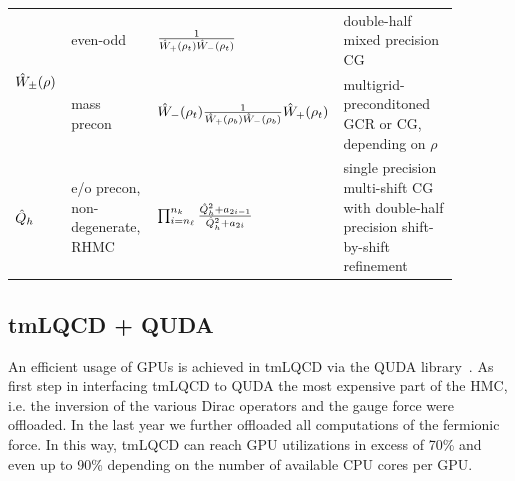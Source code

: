 \documentclass[a0,portrait]{a0poster}
\begin{document}
\begin{multicols}{2}
    \begin{tabular}{p{0.08\linewidth}p{0.2\linewidth}p{0.3\linewidth}p{0.3\linewidth}}
    \multirow{2}{*}{$\hat{W}_\pm(\rho)$} & even-odd & \centering $\frac{1}{\hat{W}_{+}(\rho_t) \hat{W}_{-}(\rho_t)}$ & double-half mixed precision CG \\
      & mass precon & \centering $\hat{W}_{-}(\rho_t) \frac{1}{\hat{W}_{+}(\rho_b) \hat{W}_{-}(\rho_b)} \hat{W}_{+}(\rho_t)$ & multigrid-preconditoned GCR or CG, depending on $\rho$ \\
      $\hat{Q}_h$ & e/o precon, non-degenerate, RHMC & \centering $\prod_{i=n_\ell}^{n_k} \frac{ \hat{Q}^2_h + a_{2i-1} }{ \hat{Q}^2_h + a_{2i} }$ & single precision multi-shift CG with double-half precision shift-by-shift refinement
    \end{tabular}

    \subsection*{tmLQCD + QUDA}

    An efficient usage of GPUs is achieved in tmLQCD via the QUDA library~\cite{Clark:2009wm,Babich:2011np}. As first step in interfacing tmLQCD to QUDA \cite{Kostrzewa:2022hsv} the most expensive part of the HMC, i.e. the inversion of the various Dirac operators and the gauge force were offloaded. In the last year we further offloaded all computations of the fermionic force. In this way, tmLQCD can reach GPU utilizations in excess of 70\% and even up to 90\% depending on the number of available CPU cores per GPU.


\end{multicols}
\end{document}
